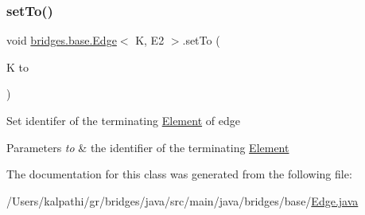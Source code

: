 \subsubsection{\texorpdfstring{setTo()}{setTo()}}
{\footnotesize\ttfamily void \mbox{\hyperlink{classbridges_1_1base_1_1_edge}{bridges.\+base.\+Edge}}$<$ K, E2 $>$.set\+To (\begin{DoxyParamCaption}\item[{K}]{to }\end{DoxyParamCaption})}

Set identifer of the terminating \mbox{\hyperlink{classbridges_1_1base_1_1_element}{Element}} of edge


\begin{DoxyParams}{Parameters}
{\em to} & the identifier of the terminating \mbox{\hyperlink{classbridges_1_1base_1_1_element}{Element}} \\
\hline
\end{DoxyParams}


The documentation for this class was generated from the following file\+:\begin{DoxyCompactItemize}
\item 
/\+Users/kalpathi/gr/bridges/java/src/main/java/bridges/base/\mbox{\hyperlink{_edge_8java}{Edge.\+java}}\end{DoxyCompactItemize}
